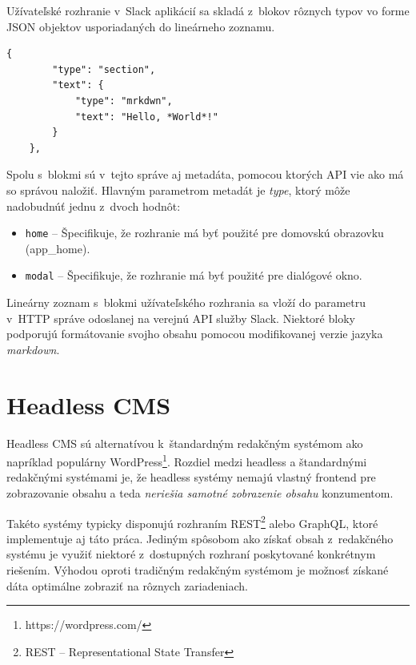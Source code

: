 Užívateľské rozhranie v~Slack aplikácií sa skladá z~blokov rôznych typov vo forme JSON objektov usporiadaných do lineárneho zoznamu. \\

\begin{lstlisting}[caption=Príklad jednoduchého bloku v~Slack aplikácií.]
	{
		"type": "section",
		"text": {
			"type": "mrkdwn",
			"text": "Hello, *World*!"
		}
	},
\end{lstlisting}

\medskip

\noindent Spolu s~blokmi sú v~tejto správe aj metadáta, pomocou ktorých API vie ako má so správou naložiť. Hlavným parametrom metadát je \emph{type}, ktorý môže nadobudnúť jednu z~dvoch hodnôt:

\begin{itemize}
	\item \texttt{home} -- Špecifikuje, že rozhranie má byť použité pre domovskú obrazovku (app\_home).
	\item \texttt{modal} -- Špecifikuje, že rozhranie má byť použité pre dialógové okno.
\end{itemize}

\noindent Lineárny zoznam s~blokmi užívateľského rozhrania sa vloží do parametru  v~HTTP správe odoslanej na verejnú API služby Slack. Niektoré bloky podporujú formátovanie svojho obsahu pomocou modifikovanej verzie jazyka \emph{markdown}.

\chapter{Headless CMS}
\label{theory:headless}
Headless CMS sú alternatívou k~štandardným redakčným systémom ako napríklad populárny WordPress\footnote{https://wordpress.com/}. Rozdiel medzi headless a štandardnými redakčnými systémami je, že headless systémy nemajú vlastný frontend pre zobrazovanie obsahu a teda \emph{neriešia samotné zobrazenie obsahu} konzumentom.

Takéto systémy typicky disponujú rozhraním REST\footnote{REST -- Representational State Transfer} alebo GraphQL, ktoré implementuje aj táto práca. Jediným spôsobom ako získať obsah z~redakčného systému je využiť niektoré z~dostupných rozhraní poskytované konkrétnym riešením. Výhodou oproti tradičným redakčným systémom je možnosť získané dáta optimálne zobraziť na rôznych zariadeniach. 

